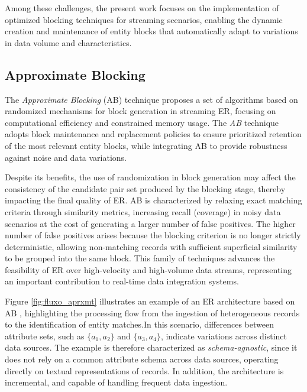 \documentclass{ieeeaccess}
\begin{document}
Among these challenges, the present work focuses on the implementation of optimized blocking techniques for streaming scenarios, enabling the dynamic creation and maintenance of entity blocks that automatically adapt to variations in data volume and characteristics.

\subsection{Approximate Blocking}

The \textit{Approximate Blocking} (AB) technique \cite{10.1109/TKDE.2024.3361022} proposes a set of algorithms based on randomized mechanisms for block generation in streaming ER, focusing on computational efficiency and constrained memory usage. The \textit{AB} technique adopts block maintenance and replacement policies to ensure prioritized retention of the most relevant entity blocks, while integrating AB to provide robustness against noise and data variations.

Despite its benefits, the use of randomization in block generation may affect the consistency of the candidate pair set produced by the blocking stage, thereby impacting the final quality of ER. AB is characterized by relaxing exact matching criteria through similarity metrics, increasing recall (coverage) in noisy data scenarios at the cost of generating a larger number of false positives. The higher number of false positives arises because the blocking criterion is no longer strictly deterministic, allowing non-matching records with sufficient superficial similarity to be grouped into the same block. This family of techniques advances the feasibility of ER over high-velocity and high-volume data streams, representing an important contribution to real-time data integration systems.

Figure \ref{fig:fluxo_aprxmt} illustrates an example of an ER architecture based on AB \cite{10.1109/TKDE.2024.3361022}, highlighting the processing flow from the ingestion of heterogeneous records to the identification of entity matches.In this scenario, differences between attribute sets, such as $\{a_1, a_2\}$ and $\{a_3, a_4\}$, indicate variations across distinct data sources. The example is therefore characterized as \textit{schema-agnostic}, since it does not rely on a common attribute schema across data sources, operating directly on textual representations of records. In addition, the architecture is incremental, and capable of handling frequent data ingestion.
\end{document}
